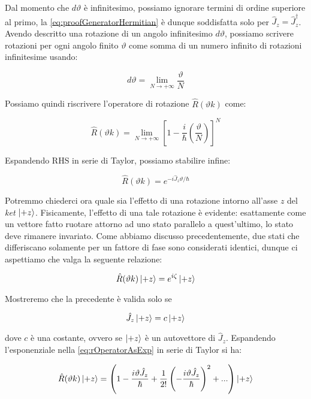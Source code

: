 Dal momento che $d \vartheta$ \`e infinitesimo, possiamo ignorare termini di ordine superiore al primo, la \eqref{eq:proofGeneratorHermitian} \`e dunque soddisfatta solo per $\hat{J}_z = \hat{J}^\dagger_z$. Avendo descritto una rotazione di un angolo infinitesimo $d \vartheta$, possiamo scrivere rotazioni per ogni angolo finito $\vartheta$ come somma di un numero infinito di rotazioni infinitesime usando:

	\[
		d \vartheta = \lim_{N \to +\infty} \frac{\vartheta}{N}
	\]

Possiamo quindi riscrivere l'operatore di rotazione $\hat{R} (\vartheta k )$ come:

	\begin{equation}
		\hat{R} (\vartheta k ) = \lim_{N \to +\infty} \left [ 1 - \frac{i}{\hbar} \left ( \frac {\vartheta}{N} \right ) \right ] ^ N
	\end{equation}

Espandendo RHS in serie di Taylor, possiamo stabilire infine:

	\begin{equation} \label{eq:rOperatorAsExp}
		\hat{R} (\vartheta k ) = e ^ {-i \hat{J}_z \vartheta / \hbar}
	\end{equation}

Potremmo chiederci ora quale sia l'effetto di una rotazione intorno all'asse $z$ del \textit{ket} $\ket{+z}$. Fisicamente, l'effetto di una tale rotazione \`e evidente: esattamente come un vettore fatto ruotare attorno ad uno stato parallelo a quest'ultimo, lo stato deve rimanere invariato. Come abbiamo discusso precedentemente, due stati che differiscano solamente per un fattore di fase sono considerati identici, dunque ci aspettiamo che valga la seguente relazione:

	\begin{equation}
		\hat{R} (\vartheta k) \ket{+z} = e^{i \zeta} \ket{+z}
	\end{equation}

Mostreremo che la precedente \`e valida solo se

	\begin{equation} \label{eq:proofEigenketCondition}
		\hat{J}_z \ket{+z} = c \ket{+z}
	\end{equation}

dove $c$ \`e una costante, ovvero se $\ket{+z}$ \`e un autovettore di $\hat{J}_z$. Espandendo l'esponenziale nella \eqref{eq:rOperatorAsExp} in serie di Taylor si ha:

	\begin{equation} \label{eq:rotGenTaylorSeries}
		\hat{R} (\vartheta k) \ket{+z} = \left ( 1 - \frac{i \vartheta \hat{J}_z}{\hbar} + \frac{1}{2!} \left ( - \frac{i \vartheta \hat{J}_z}{\hbar} \right )^2 + ... \right ) \ket{+z}
	\end {equation}


